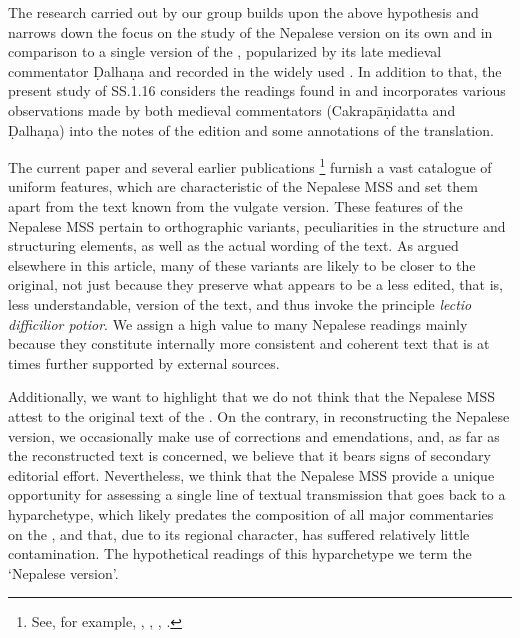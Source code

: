 The research carried out by our group builds upon the above hypothesis and narrows down the focus on the study of the Nepalese version on its own 
and in comparison to a single version of the \SS, popularized by its late medieval commentator Ḍalhaṇa and recorded in the widely used \cite{vulgate}. In addition to that, the present study of SS.1.16 considers the readings found in \cite{acar-1939} and incorporates various observations made by both medieval commentators (Cakrapāṇidatta and Ḍalhaṇa) into the notes of the edition and some annotations of the translation.

The current paper and several earlier publications%
    \footnote{%
    See, for example, \citet{hari-2011}, \citet{wuja-2013}, \citet{birc-2021}, \citet{birc-2021a}.%
    } 
furnish a vast catalogue of uniform features, which are characteristic of the Nepalese MSS and set them apart from the text known from the vulgate version. These features of the Nepalese MSS pertain to orthographic variants, peculiarities in the structure and structuring elements, as well as the actual wording of the text. As argued elsewhere in this article, many of these variants are likely to be closer to the original, not just because they preserve what appears to be a less edited, that is, less understandable, version of the text, and thus invoke the principle \emph{lectio difficilior potior}. We assign a high value to many Nepalese readings mainly because they constitute internally more consistent and coherent text that is at times further supported by external sources.
 
Additionally, we want to highlight that we do not think that the Nepalese MSS attest to the original text of the \SS. On the contrary, in reconstructing the Nepalese version, we occasionally make use of corrections and emendations, and, as far as the reconstructed text is concerned, we believe that it bears signs of secondary editorial effort.
Nevertheless, we think that the Nepalese MSS provide a unique opportunity for assessing a single line of textual transmission that goes back to a hyparchetype, which likely predates the composition of all major commentaries on the \SS, and that, due to its regional character, has suffered relatively little contamination. The hypothetical readings of this hyparchetype we term the `Nepalese version'. 


